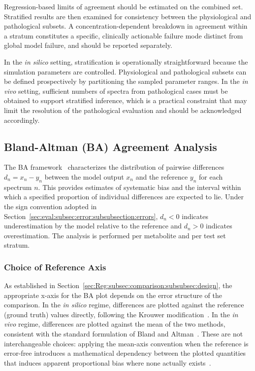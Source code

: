Regression-based limits of agreement should be estimated on the combined set. Stratified results are then examined for consistency between the physiological and pathological subsets. A concentration-dependent breakdown in agreement within a stratum constitutes a specific, clinically actionable failure mode distinct from global model failure, and should be reported separately.

In the \textit{in silico} setting, stratification is operationally straightforward because the simulation parameters are controlled. Physiological and pathological subsets can be defined prospectively by partitioning the sampled parameter ranges. In the \textit{in vivo} setting, sufficient numbers of spectra from pathological cases must be obtained to support stratified inference, which is a practical constraint that may limit the resolution of the pathological evaluation and should be acknowledged accordingly.

\subsection{Bland-Altman (BA) Agreement Analysis}
\label{sec:Reg:subsec:comparison:subsubsec:ba}
The BA framework~\cite{Bland1986,Mansournia2021} characterizes the distribution of pairwise differences $d_n = x_n - y_n$ between the \DL model output $x_n$ and the reference $y_n$ for each spectrum $n$. This provides estimates of systematic bias and the interval within which a specified proportion of individual differences are expected to lie. Under the sign convention adopted in Section~\ref{sec:eval:subsec:error:subsubsection:errors}, $d_n < 0$ indicates underestimation by the \DL model relative to the reference and $d_n > 0$ indicates overestimation. The analysis is performed per metabolite and per test set stratum.

\subsubsection{Choice of Reference Axis}
As established in Section~\ref{sec:Reg:subsec:comparison:subsubsec:design}, the appropriate x-axis for the BA plot depends on the error structure of the comparison. In the \textit{in silico} regime, differences are plotted against the reference (ground truth) values directly, following the Krouwer modification~\cite{Krouwer2008}. In the \textit{in vivo} regime, differences are plotted against the mean of the two methods, consistent with the standard formulation of Bland and Altman~\cite{Bland1986}. These are not interchangeable choices: applying the mean-axis convention when the reference is error-free introduces a mathematical dependency between the plotted quantities that induces apparent proportional bias where none actually exists~\cite{Cesana2024}.

